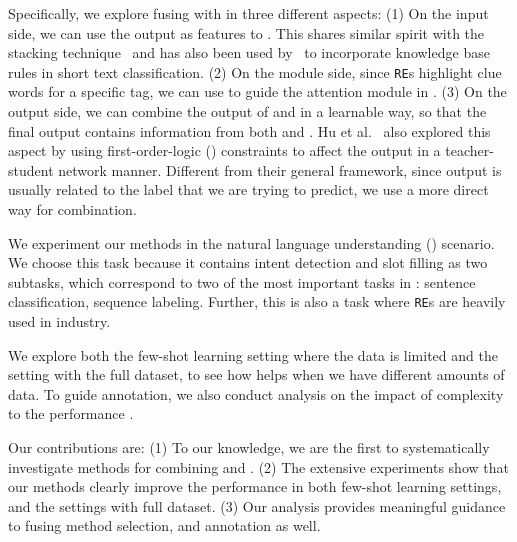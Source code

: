 


Specifically, we explore fusing \RE with \NN in three different aspects: (1) On the \NN input side, we can use the \RE output as features
to \NN. This shares similar spirit with the stacking technique~\cite{wolpert1992stacked} and has also been used by~\cite{wangcombining17}
to incorporate knowledge base rules in short text classification.
(2) On the \NN module side, since \texttt{RE}s highlight clue words for a
specific tag, we can use \RE to guide the attention module in \NN. (3) On the \NN output side, we can combine the output of \RE and \NN in
a learnable way, so that the final output contains information from both \NN and \RE. Hu et al.~ also explored
this aspect by using first-order-logic (\FOL) constraints to affect the \NN output in a teacher-student network manner. Different from
their general framework, since \RE output is usually related to the label that we are trying to predict, we use a more direct way for
combination.

We experiment our methods in the natural language understanding (\NLU) scenario.
We choose this task because it contains intent detection and slot filling as two subtasks, which correspond to two of the most important tasks in \NLP: sentence classification, sequence labeling. Further, this is also a task where \texttt{RE}s are heavily used in industry.

We explore both the few-shot learning setting where the data is limited and the setting with the full dataset, to see how \RE helps when we have different amounts of data.
To guide \RE annotation, we also conduct analysis on the impact of \RE complexity to the performance \NN.

Our contributions are: (1) To our knowledge, we are the first to systematically investigate methods for combining \RE and \NN. (2) The extensive experiments show that our methods clearly improve the \NN performance in both few-shot learning settings, and the settings with full dataset. (3) Our analysis provides meaningful guidance to fusing method selection, and \RE annotation as well.

